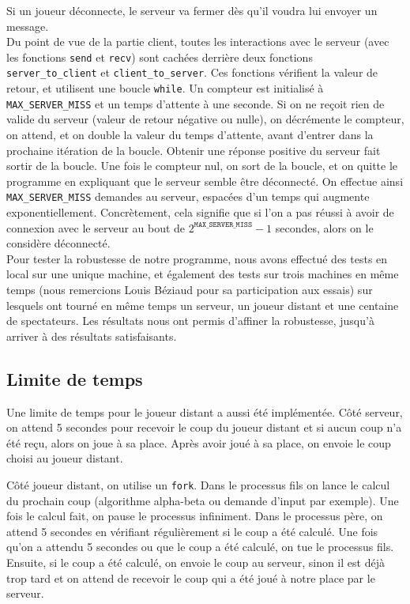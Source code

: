 \documentclass[a4paper]{article}
\begin{document}
Si un joueur déconnecte, le serveur va fermer dès qu'il voudra lui envoyer un message. \\

Du point de vue de la partie client, toutes les interactions avec le serveur 
(avec les fonctions \texttt{send} et \texttt{recv}) sont cachées derrière deux 
fonctions \texttt{server\_to\_client} et \texttt{client\_to\_server}. Ces 
fonctions vérifient la valeur de retour, et utilisent une boucle 
\texttt{while}. Un compteur est initialisé à \texttt{MAX\_SERVER\_MISS} et un 
temps d'attente à une seconde. Si on ne reçoit rien de valide du serveur 
(valeur de retour négative ou nulle), on décrémente le compteur, on attend, et 
on double la valeur du temps d'attente, avant d'entrer dans la prochaine 
itération de la boucle. Obtenir une réponse positive du serveur fait sortir de 
la boucle. Une fois le compteur nul, on sort de la boucle, et on quitte le 
programme en expliquant que le serveur semble être déconnecté. On effectue 
ainsi \texttt{MAX\_SERVER\_MISS} demandes au serveur, espacées d'un temps qui 
augmente exponentiellement. Concrètement, cela signifie que si l'on a pas 
réussi à avoir de connexion avec le serveur au bout de 
$2^{\texttt{MAX\_SERVER\_MISS}} - 1$ secondes, alors on le considère déconnecté. \\

Pour tester la robustesse de notre programme, nous avons effectué des tests en local sur une unique machine,
et également des tests sur trois machines en même temps (nous remercions Louis Béziaud pour sa participation aux essais)
sur lesquels ont tourné en même temps un serveur, un joueur distant et une centaine de spectateurs.
Les résultats nous ont permis d'affiner la robustesse, jusqu'à arriver à des résultats satisfaisants.


\subsection{Limite de temps}

Une limite de temps pour le joueur distant a aussi été implémentée. Côté 
serveur, on attend 5 secondes pour recevoir le coup du joueur distant et si 
aucun coup n'a été reçu, alors on joue à sa place. Après avoir joué à sa place, 
on envoie le coup choisi au joueur distant.

Côté joueur distant, on utilise un \texttt{fork}. Dans le processus fils on 
lance le calcul du prochain coup (algorithme alpha-beta ou demande d'input par 
exemple). Une fois le calcul fait, on pause le processus infiniment. Dans le 
processus père, on attend 5 secondes en vérifiant régulièrement si le coup a 
été calculé. Une fois qu'on a attendu 5 secondes ou que le coup a été calculé, 
on tue le processus fils. Ensuite, si le coup a été calculé, on envoie le coup 
au serveur, sinon il est déjà trop tard et on attend de recevoir le coup qui a 
été joué à notre place par le serveur.
\end{document}
